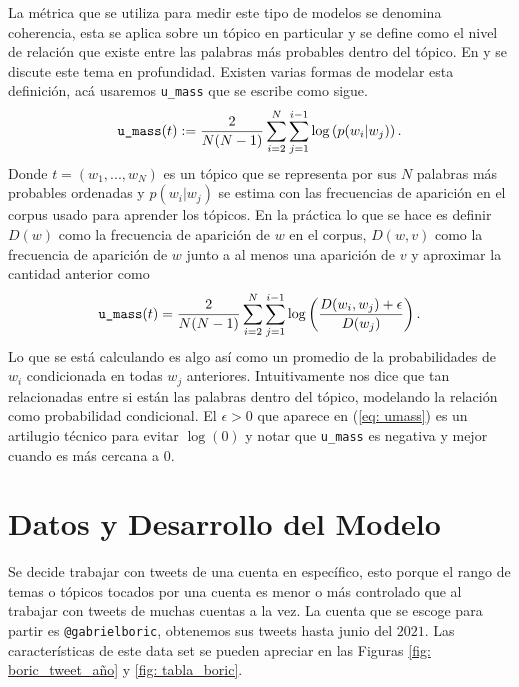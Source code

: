 \documentclass{article}
\begin{document}
	La métrica que se utiliza para medir este tipo de modelos se denomina coherencia, esta se aplica sobre un tópico en particular y se define como el nivel de relación que existe entre las palabras más probables dentro del tópico. En \cite{coherence} y \cite{coherence2} se discute este tema en profundidad. Existen varias formas de modelar esta definición, acá usaremos \texttt{u\_mass} que se escribe como sigue.
	\begin{align*}
		\texttt{u\_mass}(t) := \frac{2}{N(N-1)} \sum_{i=2}^N\sum_{j=1}^{i-1}\log \left(p(w_i|w_j)\right).
	\end{align*}
	Donde $t = (w_1,...,w_N)$ es un tópico que se representa por sus $N$ palabras más probables ordenadas y $p(w_i|w_j)$ se estima con las frecuencias de aparición en el corpus usado para aprender los tópicos. En la práctica lo que se hace es definir $D(w)$ como la frecuencia de aparición de $w$ en el corpus, $D(w,v)$ como la frecuencia de aparición de $w$ junto a al menos una aparición de $v$ y aproximar la cantidad anterior como
	\begin{align}
		\label{eq: umass}
		\texttt{u\_mass}(t) = \frac{2}{N(N-1)} \sum_{i=2}^N\sum_{j=1}^{i-1}\log \left(\frac{D(w_i,w_j)+\epsilon}{D(w_j)}\right).
	\end{align}
	Lo que se está calculando es algo así como un promedio de la probabilidades de $w_i$ condicionada en todas $w_j$ anteriores. Intuitivamente nos dice que tan relacionadas entre si están las palabras dentro del tópico, modelando la relación como probabilidad condicional. El $\epsilon>0$ que aparece en (\ref{eq: umass}) es un artilugio técnico para evitar $\log (0)$ y notar que \texttt{u\_mass} es negativa y mejor cuando es más cercana a $0$.
\section{Datos y Desarrollo del Modelo}
	Se decide trabajar con tweets de una cuenta en específico, esto porque el rango de temas o tópicos tocados por una cuenta es menor o más controlado que al trabajar con tweets de muchas cuentas a la vez. La cuenta que se escoge para partir es \texttt{@gabrielboric}, obtenemos sus tweets hasta junio del $2021$. Las características de este data set se pueden apreciar en las Figuras \ref{fig: boric_tweet_año} y \ref{fig: tabla_boric}.

	
	
\end{document}
